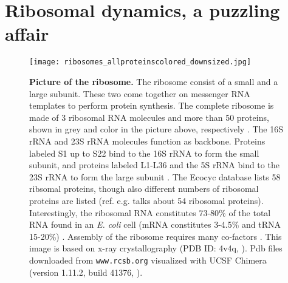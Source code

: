



\chapter{Ribosomal dynamics, a puzzling affair}
\label{chapter:ribosomes}



\begin{figure}
    \centering    
    \texttt{[image: ribosomes\_allproteinscolored\_downsized.jpg]}
    \caption{ 
        \textbf{Picture of the ribosome.}
        The ribosome consist of a small and a large subunit. These two come together on messenger RNA templates to perform protein synthesis.
        The complete ribosome is made of 3 ribosomal RNA molecules and more than 50 proteins, shown in grey and color in the picture above, respectively \cite{Chen2013}.
        The 16S rRNA and 23S rRNA molecules function as backbone. %
        Proteins labeled S1 up to S22 
        bind to the 16S rRNA to form the small subunit, and proteins labeled L1-L36 and the 5S rRNA bind to the 23S rRNA to form the large subunit \cite{Keseler2017}.
        The Ecocyc database lists 58 ribsomal proteins, though also different numbers of ribosomal proteins are listed (ref. \cite{Chen2013} e.g. talks about 54 ribosomal proteins).
        Interestingly, the ribosomal RNA constitutes 73-80\% of the total RNA found in an \textit{E. coli} cell (mRNA constitutes 3-4.5\% and tRNA 15-20\%) \cite{Norris1972}.
        Assembly of the ribosome requires many co-factors \cite{Chen2013}. %
        This image is based on x-ray crystallography (PDB ID: 4v4q, \cite{Schuwirth2005}). Pdb files downloaded from \texttt{www.rcsb.org} \cite{Berman2000} 
        visualized with UCSF Chimera (version 1.11.2, build 41376, \cite{pettersen2004}).
    }
    \label{fig:ribo:pictureofribo}
\end{figure}

